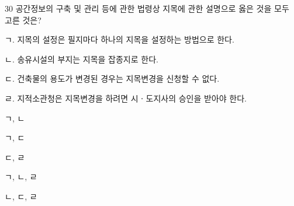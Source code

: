 \begin{question}{30}
공간정보의 구축 및 관리 등에 관한 법령상 지목에 관한 설명으로 옳은 것을 모두 고른 것은?
\begin{framedtext}
ㄱ. 지목의 설정은 필지마다 하나의 지목을 설정하는 방법으로 한다. \par
ㄴ. 송유시설의 부지는 지목을 잡종지로 한다. \par
ㄷ. 건축물의 용도가 변경된 경우는 지목변경을 신청할 수 없다. \par
ㄹ. 지적소관청은 지목변경을 하려면 시ㆍ도지사의 승인을 받아야 한다.
\end{framedtext}
\begin{choices}
  \item ㄱ, ㄴ
  \item ㄱ, ㄷ
  \item ㄷ, ㄹ
  \item ㄱ, ㄴ, ㄹ
  \item ㄴ, ㄷ, ㄹ
\end{choices}
\end{question}
